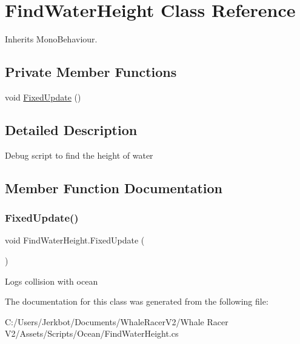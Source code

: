 \hypertarget{class_find_water_height}{}\section{Find\+Water\+Height Class Reference}
\label{class_find_water_height}


Inherits Mono\+Behaviour.

\subsection*{Private Member Functions}
\begin{DoxyCompactItemize}
\item 
void \hyperlink{class_find_water_height_ad931597fdb5a501c4670d26aa5e159b7}{Fixed\+Update} ()
\end{DoxyCompactItemize}


\subsection{Detailed Description}
Debug script to find the height of water 



\subsection{Member Function Documentation}
\mbox{\label{class_find_water_height_ad931597fdb5a501c4670d26aa5e159b7}} 
\subsubsection{\texorpdfstring{Fixed\+Update()}{FixedUpdate()}}
{\footnotesize\ttfamily void Find\+Water\+Height.\+Fixed\+Update (\begin{DoxyParamCaption}{ }\end{DoxyParamCaption})\hspace{0.3cm}{\ttfamily [private]}}



Logs collision with ocean 



The documentation for this class was generated from the following file\+:\begin{DoxyCompactItemize}
\item 
C\+:/\+Users/\+Jerkbot/\+Documents/\+Whale\+Racer\+V2/\+Whale Racer V2/\+Assets/\+Scripts/\+Ocean/Find\+Water\+Height.\+cs\end{DoxyCompactItemize}
